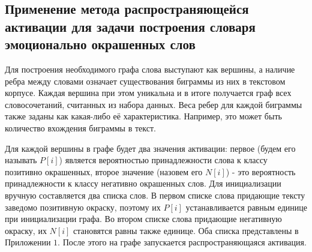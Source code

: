 \subsection{Применение метода распространяющейся активации для задачи построения
  словаря эмоционально окрашенных слов}
Для построения необходимого графа слова выступают как вершины, а наличие
ребра между словами означает существования биграммы из них в текстовом корпусе.
Каждая вершина при этом уникальна и в итоге получается граф всех словосочетаний,
считанных из набора данных. Веса ребер для каждой биграммы также заданы
как какая-либо её характеристика. Например, это может быть количество вхождения
биграммы в текст.

Для каждой вершины в графе будет два значения активации: первое (будем его
называть $P[i]$) является вероятностью принадлежности слова к классу позитивно
окрашенных, второе значение (назовем его $N[i]$) - это вероятность принадлежности
к классу негативно окрашенных слов. Для инициализации вручную составляется
два списка слов. В первом списке слова придающие тексту заведомо позитивную
окраску, поэтому их $P[i]$ устанавливается равным единице при инициализации графа.
Во втором списке слова придающие негативную окраску, их $N[i]$ становятся равны
также единице. Оба списка представлены в Приложении $1$. После этого на графе
запускается распространяющаяся активация.

\FloatBarrier

